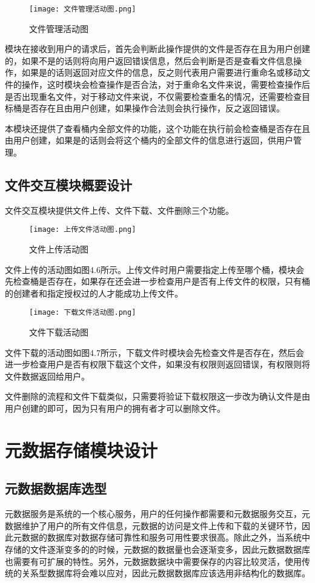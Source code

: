 \begin{figure}[h]
  \centering
  \texttt{[image: 文件管理活动图.png]}
  \caption{文件管理活动图}
\end{figure}

模块在接收到用户的请求后，首先会判断此操作提供的文件是否存在且为用户创建的，如果不是的话则将向用户返回错误信息，然后会判断是否是查看文件信息操作，如果是的话则返回对应文件的信息，反之则代表用户需要进行重命名或移动文件的操作，这时模块会检查操作是否合法，对于重命名文件来说，需要检查操作后是否出现重名文件，对于移动文件来说，不仅需要检查重名的情况，还需要检查目标桶是否存在且由用户创建，如果操作合法则会执行操作，反之返回错误。

本模块还提供了查看桶内全部文件的功能，这个功能在执行前会检查桶是否存在且由用户创建，如果是的话则会将这个桶内的全部文件的信息进行返回，供用户管理。

\subsection{文件交互模块概要设计}
文件交互模块提供文件上传、文件下载、文件删除三个功能。

\begin{figure}[h]
  \centering
  \texttt{[image: 上传文件活动图.png]}
  \caption{文件上传活动图}
\end{figure}

文件上传的活动图如图4.6所示。上传文件时用户需要指定上传至哪个桶，模块会先检查桶是否存在，如果存在还会进一步检查用户是否有上传文件的权限，只有桶的创建者和指定授权过的人才能成功上传文件。

\begin{figure}[h]
  \centering
  \texttt{[image: 下载文件活动图.png]}
  \caption{文件下载活动图}
\end{figure}

文件下载的活动图如图4.7所示，下载文件时模块会先检查文件是否存在，然后会进一步检查用户是否有权限下载这个文件，如果没有权限则返回错误，有权限则将文件数据返回给用户。

文件删除的流程和文件下载类似，只需要将验证下载权限这一步改为确认文件是由用户创建的即可，因为只有用户的拥有者才可以删除文件。

\section{元数据存储模块设计}
\subsection{元数据数据库选型}
元数据服务是系统的一个核心服务，用户的任何操作都需要和元数据服务交互，元数据维护了用户的所有文件信息，元数据的访问是文件上传和下载的关键环节，因此元数据的数据库对数据存储可靠性和服务可用性要求很高。除此之外，当系统中存储的文件逐渐变多的的时候，元数据的数据量也会逐渐变多，因此元数据数据库也需要有可扩展的特性。另外，元数据数据块中需要保存的内容比较灵活，使用传统的关系型数据库将会难以应对，因此元数据数据库应该选用非结构化的数据库。

